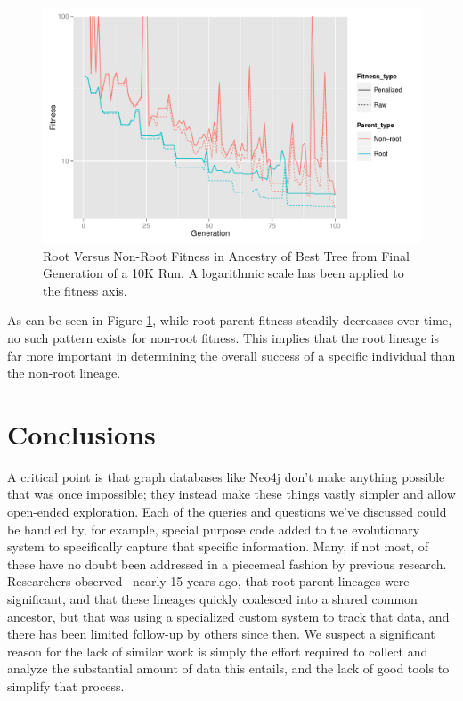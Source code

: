 \documentclass[12pt]{article}
\begin{document}
\begin{figure}[tb]
 \centering
 \includegraphics[height=0.68\textwidth]{Combined_fitness_over_time}
 \caption{Root Versus Non-Root Fitness in Ancestry of Best Tree from Final Generation of a 10K Run. A logarithmic scale has been applied to the fitness axis. }
 \label{fig:rootVsNonrootFitness}
\end{figure}

As can be seen in Figure \ref{fig:rootVsNonrootFitness}, while root parent fitness steadily decreases over time, no such pattern exists for non-root fitness. This implies that the root lineage is far more important in determining the overall success of a specific individual than the non-root lineage.

\section{Conclusions} \label{sec:conclusion}

A critical point is that graph databases like Neo4j don't make anything possible that was once impossible; they instead make these things vastly simpler and allow open-ended exploration. Each of the queries and questions we've discussed could be handled by, for example, special purpose code added to the evolutionary system to specifically capture that specific information. Many, if not most, of these have no doubt been addressed in a piecemeal fashion by previous research. Researchers observed~\cite{mcphee1999analysis} nearly 15 years ago, that root parent lineages were significant, and that these lineages quickly coalesced into a shared common ancestor, but that was using a specialized custom system to track that data, and there has been limited follow-up by others since then. We suspect a significant reason for the lack of similar work is simply the effort required to collect and analyze the substantial amount of data this entails, and the lack of good tools to simplify that process.
\end{document}
